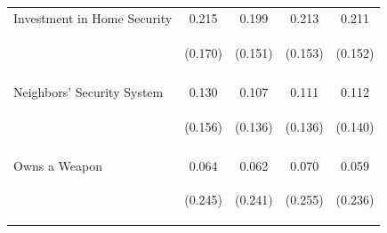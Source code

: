 \begin{center}
\begin{tabular}{lcccc}
\noalign{\smallskip}Investment in Home Security & 0.215 & 0.199 & 0.213 & 0.211\\
 & \begin{footnotesize}(0.170)\end{footnotesize} & \begin{footnotesize}(0.151)\end{footnotesize} & \begin{footnotesize}(0.153)\end{footnotesize} & \begin{footnotesize}(0.152)\end{footnotesize}\\
 & \begin{footnotesize}\end{footnotesize} & \begin{footnotesize}\end{footnotesize} & \begin{footnotesize}\end{footnotesize} & \begin{footnotesize}\end{footnotesize}\\
\noalign{\smallskip}Neighbors' Security System & 0.130 & 0.107 & 0.111 & 0.112\\
 & \begin{footnotesize}(0.156)\end{footnotesize} & \begin{footnotesize}(0.136)\end{footnotesize} & \begin{footnotesize}(0.136)\end{footnotesize} & \begin{footnotesize}(0.140)\end{footnotesize}\\
 & \begin{footnotesize}\end{footnotesize} & \begin{footnotesize}\end{footnotesize} & \begin{footnotesize}\end{footnotesize} & \begin{footnotesize}\end{footnotesize}\\
\noalign{\smallskip}Owns a Weapon & 0.064 & 0.062 & 0.070 & 0.059\\
 & \begin{footnotesize}(0.245)\end{footnotesize} & \begin{footnotesize}(0.241)\end{footnotesize} & \begin{footnotesize}(0.255)\end{footnotesize} & \begin{footnotesize}(0.236)\end{footnotesize}\\

\end{tabular}
\end{center}
